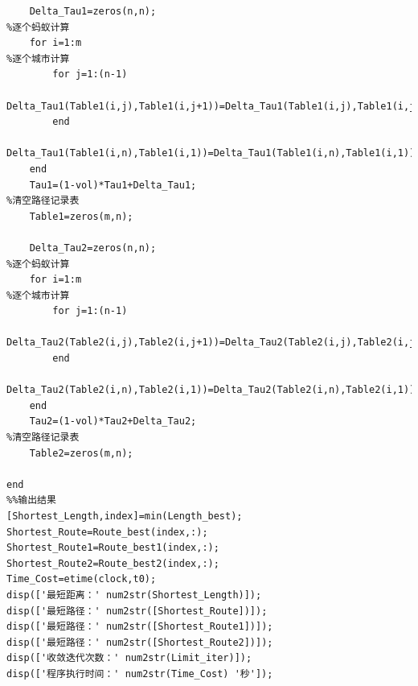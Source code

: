 \documentclass[hyperref,UTF8]{article}
\begin{document}
\begin{lstlisting}
    Delta_Tau1=zeros(n,n);                                               %逐个蚂蚁计算
    for i=1:m                                                                   %逐个城市计算
        for j=1:(n-1)
            Delta_Tau1(Table1(i,j),Table1(i,j+1))=Delta_Tau1(Table1(i,j),Table1(i,j+1))+Q/Length(i);
        end
        Delta_Tau1(Table1(i,n),Table1(i,1))=Delta_Tau1(Table1(i,n),Table1(i,1))+Q/Length(i);
    end
    Tau1=(1-vol)*Tau1+Delta_Tau1;                                              %清空路径记录表
    Table1=zeros(m,n);
    
    Delta_Tau2=zeros(n,n);                                               %逐个蚂蚁计算
    for i=1:m                                                                   %逐个城市计算
        for j=1:(n-1)
            Delta_Tau2(Table2(i,j),Table2(i,j+1))=Delta_Tau2(Table2(i,j),Table2(i,j+1))+Q/Length(i);
        end
        Delta_Tau2(Table2(i,n),Table2(i,1))=Delta_Tau2(Table2(i,n),Table2(i,1))+Q/Length(i);
    end
    Tau2=(1-vol)*Tau2+Delta_Tau2;                                              %清空路径记录表
    Table2=zeros(m,n);
    
end
%%输出结果
[Shortest_Length,index]=min(Length_best);
Shortest_Route=Route_best(index,:);
Shortest_Route1=Route_best1(index,:);
Shortest_Route2=Route_best2(index,:);
Time_Cost=etime(clock,t0);
disp(['最短距离：' num2str(Shortest_Length)]);
disp(['最短路径：' num2str([Shortest_Route])]);
disp(['最短路径：' num2str([Shortest_Route1])]);
disp(['最短路径：' num2str([Shortest_Route2])]);
disp(['收敛迭代次数：' num2str(Limit_iter)]);
disp(['程序执行时间：' num2str(Time_Cost) '秒']);
\end{lstlisting}
\end{document}
